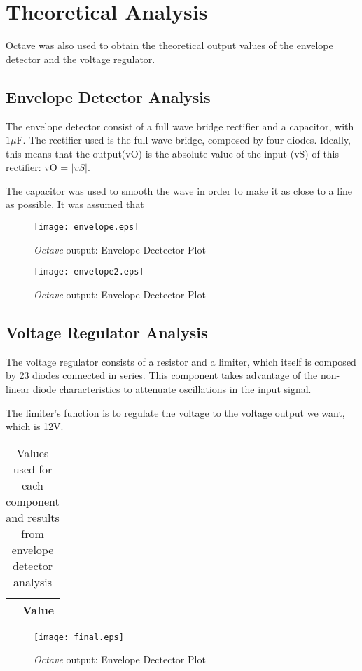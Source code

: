 \section{Theoretical Analysis} \label{sec:analysis}


Octave was also used to obtain the theoretical output values of the envelope detector and the voltage regulator. 



\subsection{Envelope Detector Analysis}

The envelope detector consist of a full wave bridge rectifier and a capacitor, with $1\mu$F.
The rectifier used is the full wave bridge, composed by four diodes. Ideally, this means that the output(vO) is the absolute value of the input (vS) of this rectifier: vO = $|vS|$.

The capacitor was used to smooth the wave in order to make it as close to a line as possible. It was assumed that 



\begin{figure}[h]
    \centering
    \texttt{[image: envelope.eps]}
    \caption{{\it Octave} output: Envelope Dectector Plot}
    \label{fig:OctaveOut}
\end{figure}

\begin{figure}[h]
    \centering
    \texttt{[image: envelope2.eps]}
    \caption{{\it Octave} output: Envelope Dectector Plot}
    \label{fig:OctaveOut}
\end{figure}



\subsection{Voltage Regulator Analysis}

The voltage regulator consists of a resistor and a limiter, which itself is composed by 23 diodes connected in series. This component takes advantage of the non-linear diode characteristics to attenuate oscillations in the input signal.

The limiter’s function is to regulate the voltage to the voltage output we want, which is 12V.

\begin{table}[h]
  \centering
  \begin{tabular}{|c|c|}
    \hline    
     & { Value} \\ \hline
    
 \end{tabular}
 \caption{Values used for each component and results from envelope detector analysis}
  \label{tab:op2}
\end{table}


\begin{figure}[h]
    \centering
    \texttt{[image: final.eps]}
    \caption{{\it Octave} output: Envelope Dectector Plot}
    \label{fig:OctaveOut}
\end{figure}

